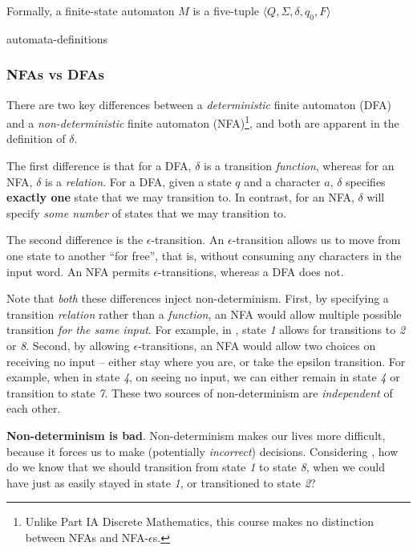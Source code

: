Formally, a finite-state automaton $M$ is a five-tuple $\langle Q, \Sigma, \delta, q_0, F \rangle$

\begin{center}
{automata-definitions}
\end{center}

\subsubsection{NFAs vs DFAs}
There are two key differences between a \textit{deterministic} finite automaton (DFA) and a \textit{non-deterministic} finite automaton (NFA)\footnote{Unlike {\sffamily Part IA Discrete Mathematics}, this course makes no distinction between NFAs and NFA-$\epsilon$s.}, and both are apparent in the definition of $\delta$. 

The first difference is that for a DFA, $\delta$ is a transition \emph{function}, whereas for an NFA, $\delta$ is a \emph{relation}. For a DFA, given a state $q$ and a character $a$, $\delta$ specifies \textbf{exactly one} state that we may transition to. In contrast, for an NFA, $\delta$ will specify \emph{some number} of states that we may transition to.

The second difference is the $\epsilon$-transition. An $\epsilon$-transition allows us to move from one state to another ``for free'', that is, without consuming any characters in the input word. An NFA permits $\epsilon$-transitions, whereas a DFA does not. 

Note that \emph{both} these differences inject non-determinism. First, by specifying a transition \emph{relation} rather than a \emph{function}, an NFA would allow multiple possible transition \emph{for the same input}. For example, in , state \textit{1} allows for transitions to \textit{2} or \textit{8}. Second, by allowing $\epsilon$-transitions, an NFA would allow two choices on receiving no input -- either stay where you are, or take the epsilon transition. For example, when in state \textit{4}, on seeing no input, we can either remain in state \textit{4} or transition to state \textit{7}. These two sources of non-determinism are \textit{independent} of each other.

\textbf{Non-determinism is bad}. Non-determinism makes our lives more difficult, because it forces us to make (potentially \emph{incorrect}) decisions. Considering , how do we know that we should transition from state \textit{1} to state \textit{8}, when we could have just as easily stayed in state \textit{1}, or transitioned to state \textit{2}?

